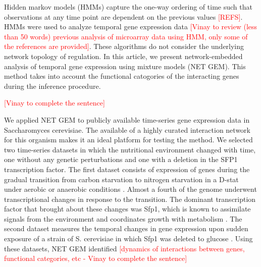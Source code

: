 \documentclass{bioinfo}
\begin{document}
Hidden markov models (HMMs) capture the one-way ordering of time such
that observations at any time point are dependent on the previous
values \textcolor{red}{[REFS]}. HMMs were used to analyze temporal
gene expression data  
\textcolor{red}{[Vinay to review (less than 50 words) previous
  analysis of microarray data using HMM, only some of the references
  are provided]}. These algorithms do not consider the underlying
network topology of regulation. In this article, we present
network-embedded analysis of temporal gene expression using mixture
models (NET GEM). This method takes into account the functional
catogories of the interacting genes during the inference procedure. 

\textcolor{red}{[Vinay to complete the sentence]} 

We applied NET GEM to publicly available time-series gene expression
data in Saccharomyces cerevisiae. The available of a highly curated
interaction network for this organism makes it an ideal platform for
testing the method. We selected two time-series datasets in which the
nutritional environment changed with time, one without any genetic
perturbations and one with a deletion in the SFP1 transcription
factor. The first dataset consists of expression of genes during the
gradual transition from carbon starvation to nitrogen starvation in a
D-stat under aerobic or anaerobic conditions . Almost a fourth of the genome underwent transcriptional changes
in response to the transition. The dominant transcription factor that
brought about these changes was Sfp1, which is known to assimilate
signals from the environment and coordinates growth with metabolism
. The second dataset measures the temporal
changes in gene expression upon sudden exposure of a strain of
S. cerevisiae in which Sfp1 was deleted to glucose . Using these datasets, NET GEM identified
\textcolor{red}{[dynamics of interactions between genes, functional
  categories, etc  - Vinay to complete the sentence]} 
 
\end{document}
